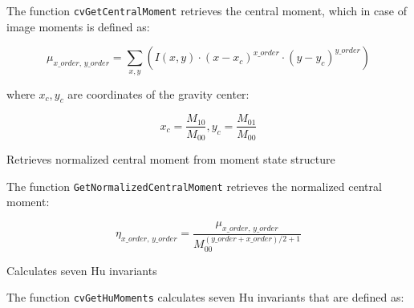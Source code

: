 The function \texttt{cvGetCentralMoment} retrieves the central moment, which in case of image moments is defined as:

\[
\mu_{x\_order, \, y\_order} = \sum_{x,y} (I(x,y) \cdot (x-x_c)^{x\_order} \cdot (y-y_c)^{y\_order})
\]

where $x_c,y_c$ are coordinates of the gravity center:

\[
x_c=\frac{M_{10}}{M_{00}}, y_c=\frac{M_{01}}{M_{00}}
\]

\label{GetNormalizedCentralMoment}

Retrieves normalized central moment from moment state structure


\begin{description}
\end{description}

The function \texttt{GetNormalizedCentralMoment} retrieves the normalized central moment:

\[
\eta_{x\_order, \, y\_order} = \frac{\mu_{x\_order, \, y\_order}}{M_{00}^{(y\_order+x\_order)/2+1}}
\]

\label{GetHuMoments}

Calculates seven Hu invariants


\begin{description}
\end{description}

The function \texttt{cvGetHuMoments} calculates seven Hu invariants that are defined as:

